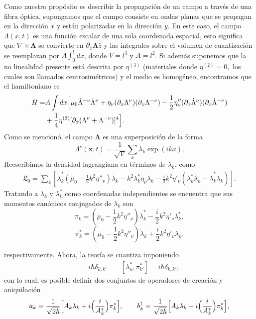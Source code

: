 Como nuestro prop\'{o}sito es describir la propagaci\'{o}n de un campo a trav\'{e}s de una fibra \'{o}ptica, supongamos que el campo consiste en ondas planas que se propagan en la dirección $x$ y están polarizadas en la dirección $y$. En este caso, el campo $\Lambda(x,t)$ es una funci\'{o}n escalar de una sola coordenada espacial, esto significa que $\nabla \times \mathbf{\Lambda}$ se convierte en $\partial_x  \mathbf{\Lambda} \widehat{z} $ y las integrales sobre el volumen de cuantizaci\'{o}n se reemplazan por $ A\int_0^ldx$, donde $V=l^3$ y $A=l^2$. Si además suponemos que la no linealidad presente está descrita por $\eta^{(3)}$ (materiales donde $\eta^{(2)}=0,$ los cuales son llamados centrosim\'{e}tricos) y el medio es homogéneo, encontramos que
el hamiltoniano es
\begin{align}
\nonumber H=&A\int dx\Bigl[\mu_0\dot{\Lambda}^{-\nu}\dot{\Lambda}^{\nu}+ \eta_{\nu}(\partial_{x}\Lambda^{\nu})(\partial_{x}\Lambda^{-\nu})-\frac{1}{2}\eta_{\nu}''(\partial_x\dot{\Lambda}^{\nu})(\partial_x\dot{\Lambda}^{-\nu})\\
 &+\frac{1}{4}\eta^{(3)}[\partial_x(\Lambda^{\nu}+\Lambda^{-\nu})]^4\Bigr].
\end{align}\label{ec:hamil}
Como se mencionó, el campo  $\mathbf{\Lambda}$ es una superposici\'{o}n de la forma
\begin{equation}\label{ec:defla}
\Lambda^{\nu}(\textbf{x},t)=\frac{1}{\sqrt{V}}\sum_k \lambda_k\exp(ikx).
\end{equation}
 Reescribimos la densidad lagrangiana en t\'{e}rminos de $\lambda_k$, como
\begin{align}
\mathfrak{L}_0=\sum_k[\dot{\lambda}_k^*(\mu_0-\frac{1}{2}k^2\eta''_{\nu})\dot{\lambda}_k-k^2\lambda_k^*\eta_{\nu}\lambda_k
-\frac{i}{2}k^2\eta'_{\nu}(\lambda_k^*\dot{\lambda}_k-\dot{\lambda}_k^*\lambda_k)].
\end{align}
Tratando a $\lambda_k$ y $\lambda^*_k$ como coordenadas independientes se encuentra que sus  momentos can\'{o}nicos conjugados de $\lambda_k$ son
\begin{equation}
\pi_k=(\mu_0-\frac{1}{2}k^2\eta''_{\nu})\dot{\lambda}_k^*-\frac{i}{2}k^2\eta'_{\nu}\lambda_k^*,
\end{equation}
\begin{equation}
\pi_k^*=(\mu_0-\frac{1}{2}k^2\eta''_{\nu})\dot{\lambda}_k+\frac{i}{2}k^2\eta'_{\nu}\lambda_k.
\end{equation}

respectivamente. Ahora, la teor\'{i}a se cuantiza imponiendo 
\begin{align}
[\lambda_k,\pi_{k'}]=i\hbar\delta_{k,k'} \qquad [\lambda_k^*,\pi_{k'}^*]=i\hbar\delta_{k,k'},
\end{align}
con lo cual, es posible definir dos conjuntos de operadores de creaci\'{o}n y aniquilaci\'{o}n
\begin{align}\label{ec:xx}
a_k=\frac{1}{\sqrt{2\hbar}}\Bigl[A_k\lambda_k+i\Bigl(\frac{i}{A_k^*}\Bigr)\pi_k^*\Bigr],\qquad
b_k^{\dagger}=\frac{1}{\sqrt{2\hbar}}\Bigl[A_k\lambda_k-i\Bigl(\frac{i}{A_k^*}\Bigr)\pi_k^*\Bigr],
\end{align}\label{ec:creation}

